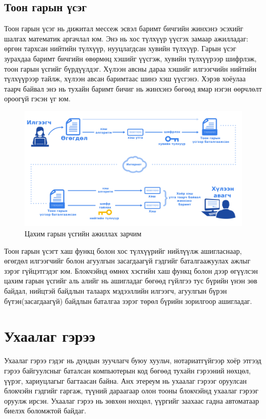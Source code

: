 \subsection{Тоон гарын үсэг}
Тоон гарын үсэг нь дижитал мессеж эсвэл баримт бичгийн жинхэнэ эсэхийг шалгах математик аргачлал юм. Энэ нь хос түлхүүр үүсгэх замаар ажилладаг: өргөн тархсан нийтийн түлхүүр, нууцлагдсан хувийн түлхүүр. Гарын үсэг зурахдаа баримт бичгийн өвөрмөц хэшийг үүсгэж, хувийн түлхүүрээр шифрлэж, тоон гарын үсгийг бүрдүүлдэг. Хүлээн авсны дараа хэшийг илгээгчийн нийтийн түлхүүрээр тайлж, хүлээн авсан баримтаас шинэ хэш үүсгэнэ. Хэрэв хоёулаа таарч байвал энэ нь тухайн баримт бичиг нь жинхэнэ бөгөөд ямар нэгэн өөрчлөлт ороогүй гэсэн үг юм.

\begin{figure}[h!]
	\centering
	\includegraphics[scale=0.38]{src/images/dig-sign.png}
	\caption{Цахим гарын үсгийн ажиллах зарчим}
\end{figure}

\newpage
Тоон гарын үсэгт хаш функц болон хос түлхүүрийг нийлүүлж ашигласнаар, өгөгдөл илгээгчийг болон агуулгын засагдаагүй гэдгийг баталгаажуулах ажлыг зэрэг гүйцэтгэдэг юм. Блокчэйнд өмнөх хэсгийн хаш функц болон дээр өгүүлсэн цахим гарын үсгийг аль алийг нь ашигладаг бөгөөд гүйлгээ тус бүрийн үнэн зөв байдал, нийцтэй байдлын талаарх мэдээллийн илгээгч, агуулгын бүрэн бүтэн(засагдаагүй) байдлын баталгаа зэрэг төрөл бүрийн зорилгоор ашигладаг.

\section{Ухаалаг гэрээ}
Ухаалаг гэрээ гэдэг нь дундын зуучлагч буюу хуульч, нотариатгүйгээр хоёр этгээд гэрээ байгуулсныг баталсан компьютерын код бөгөөд тухайн гэрээний нөхцөл, үүрэг, хариуцлагыг багтаасан байна. Анх этереум нь ухаалаг гэрээг оруулсан блокчэйн гэдгийг гаргаж, түүний дараагаар олон тооны блокчэйнд ухаалаг гэрээг оруулж ирсэн. Ухаалаг гэрээ нь зөвхөн нөхцөл, үүргийг заахаас гадна автоматаар биелэх боломжтой байдаг.

